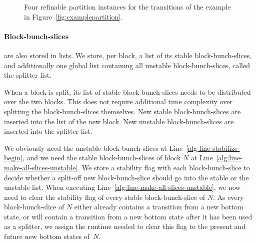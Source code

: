 \documentclass[a4paper,10pt]{article}
\theoremstyle{definition}
\theoremstyle{plain}
\begin{document}
\begin{figure}[htp]
\begin{subfigure}{\linewidth}
{
	}

	\end{subfigure}

	\caption{Four refinable partition instances for the transitions of the example in Figure~\ref{fig:examplepartition}.\label{fig:exampletransitions}}
\end{figure}

\paragraph{Block-bunch-slices}
are also stored in lists.
We store, per block, a list of its stable block-bunch-slices,
and additionally one global list containing all unstable block-bunch-slices, called the splitter list.

When a block is split, its list of stable block-bunch-slices needs to be distributed over the two blocks.
This does not require additional time complexity over splitting the block-bunch-slices themselves.
New stable block-bunch-slices are inserted into the list of the new block.
New unstable block-bunch-slices are inserted into the splitter list.

We obviously need the unstable block-bunch-slices at Line~\ref{alg-line-stabilize-begin},
and we need the stable block-bunch-slices of block $N$ at Line~\ref{alg:line-make-all-slices-unstable}.
We store a stability flag with each block-bunch-slice
to decide whether a split-off new block-bunch-slice should go into the stable or the unstable list.
When executing Line~\ref{alg:line-make-all-slices-unstable}, we now need to clear the stability flag of every stable block-bunch-slice of $N$.
As every block-bunch-slice of $N$ either already contains a transition from a new bottom state,
or will contain a transition from a new bottom state after it has been used as a splitter,
we assign the runtime needed to clear this flag to the present and future new bottom states of~$N$.
\end{document}

